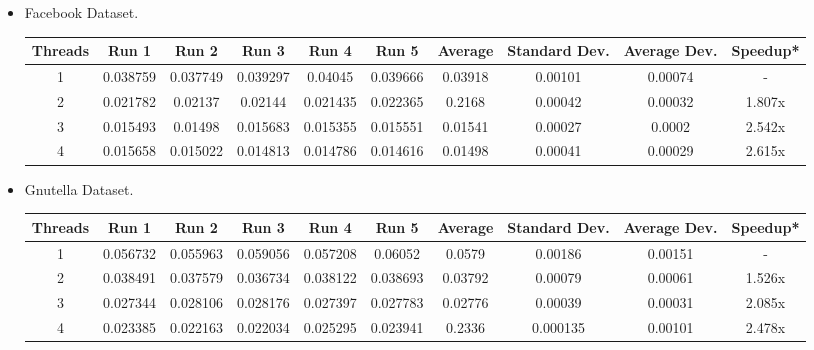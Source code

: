 \documentclass{article}
\begin{document}
\begin{itemize}
  \item Facebook Dataset.
 \begin{center}
    \begin{tabular}{||c | c c c c c | c c c | c||} 
    \hline
    Threads & Run 1 & Run 2 & Run 3 & Run 4 & Run 5 & Average & Standard Dev. & Average Dev. & Speedup* \\ [0.5ex] 
    \hline\hline
    1 & 0.038759 & 0.037749 & 0.039297 & 0.04045 & 0.039666 & 0.03918 & 0.00101 & 0.00074 & - \\ 
    \hline
    2 & 0.021782 & 0.02137 & 0.02144 & 0.021435 & 0.022365 & 0.2168 & 0.00042 & 0.00032 & 1.807x \\ 
    \hline
    3 & 0.015493 & 0.01498 & 0.015683 & 0.015355 & 0.015551 & 0.01541 & 0.00027 & 0.0002 & 2.542x \\ 
    \hline
    4 & 0.015658 & 0.015022 & 0.014813 & 0.014786 & 0.014616 & 0.01498 & 0.00041 & 0.00029 & 2.615x \\ 
    \hline
    \end{tabular}
    \end{center}
  
  \item Gnutella Dataset.
  \begin{center}
    \begin{tabular}{||c | c c c c c | c c c | c||} 
    \hline
    Threads & Run 1 & Run 2 & Run 3 & Run 4 & Run 5 & Average & Standard Dev. & Average Dev. & Speedup* \\ [0.5ex] 
    \hline\hline
    1 & 0.056732 & 0.055963 & 0.059056 & 0.057208 & 0.06052 & 0.0579 & 0.00186 & 0.00151 & - \\ 
    \hline
    2 & 0.038491 & 0.037579 & 0.036734 & 0.038122 & 0.038693 & 0.03792 & 0.00079 & 0.00061 & 1.526x \\ 
    \hline
    3 & 0.027344 & 0.028106 & 0.028176 & 0.027397 & 0.027783 & 0.02776 & 0.00039 & 0.00031 & 2.085x \\ 
    \hline
    4 & 0.023385 & 0.022163 & 0.022034 & 0.025295 & 0.023941 & 0.2336 & 0.000135 & 0.00101 & 2.478x \\ 
    \hline
    \end{tabular}
    \end{center}
    

\end{itemize}
\end{document}
